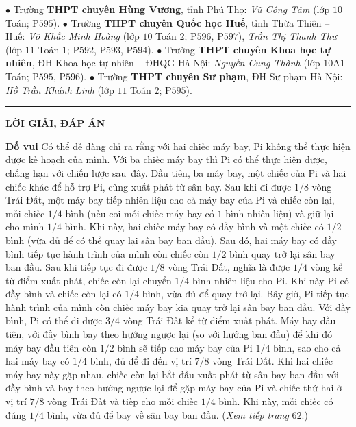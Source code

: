 \begin{multicols}{2}
	\vskip 0.05cm
	$\bullet$ Trường \textbf{\color{thachthuctoanhoc}THPT chuyên Hùng Vương}, tỉnh Phú Thọ: \textit{Vũ Công Tâm} (lớp $10$ Toán; P$595$).
	\vskip 0.05cm
	$\bullet$ Trường \textbf{\color{thachthuctoanhoc}THPT chuyên Quốc học Huế}, tỉnh Thừa Thiên -- Huế: \textit{Võ Khắc Minh Hoàng} (lớp $10$ Toán $2$; P$596$, P$597$), \textit{Trần Thị Thanh Thư} (lớp $11$ Toán $1$; P$592$, P$593$, P$594$).
	\vskip 0.05cm
	$\bullet$ Trường \textbf{\color{thachthuctoanhoc}THPT chuyên Khoa học tự nhiên}, ĐH Khoa học tự nhiên -- ĐHQG Hà Nội: \textit{Nguyễn Cung Thành} (lớp $10$A$1$ Toán; P$595$, P$596$).
	\vskip 0.05cm
	$\bullet$ Trường \textbf{\color{thachthuctoanhoc}THPT chuyên Sư phạm}, ĐH Sư phạm Hà Nội: \textit{Hồ Trần Khánh Linh} (lớp $11$ Toán $2$; P$595$).
\end{multicols}
\vspace*{-10pt}
\rule{1\linewidth}{0.1pt}
\begin{center}
	\textbf{\Large\color{thachthuctoanhoc}LỜI GIẢI, ĐÁP ÁN}
\end{center}
\begin{multicols}{2}
	\textbf{\color{thachthuctoanhoc}Đố vui}
	\vskip 0.1cm 
	Có thể dễ dàng chỉ ra rằng với hai chiếc máy bay, Pi không thể thực hiện được kế hoạch của mình. Với ba chiếc máy bay thì Pi có thể thực hiện được, chẳng hạn với chiến lược sau~đây.   
	\vskip 0.1cm
	Đầu tiên, ba máy bay, một chiếc của Pi và hai chiếc khác để hỗ trợ Pi, cùng xuất phát từ sân bay. Sau khi đi được $1/8$ vòng Trái Đất, một máy bay tiếp nhiên liệu cho cả máy bay của Pi và chiếc còn lại, mỗi chiếc $1/4$ bình (nếu coi mỗi chiếc máy bay có $1$ bình nhiên liệu) và giữ lại cho mình $1/4$ bình. Khi này, hai chiếc máy bay có đầy bình và một chiếc có $1/2$ bình (vừa đủ để có thể quay lại sân bay ban đầu). Sau đó, hai máy bay có đầy bình tiếp tục hành trình của mình còn chiếc còn $1/2$ bình quay trở lại sân bay ban đầu. 
	\vskip 0.1cm
	Sau khi tiếp tục đi được $1/8$ vòng Trái Đất, nghĩa là được $1/4$ vòng kể từ điểm xuất phát, chiếc còn lại chuyển $1/4$ bình nhiên liệu cho Pi. Khi này Pi có đầy bình và chiếc còn lại có $1/4$ bình, vừa đủ để quay trở lại. Bây giờ, Pi tiếp tục hành trình của mình còn chiếc máy bay kia quay trở lại sân bay ban đầu. Với đầy bình, Pi có thể đi được $3/4$ vòng Trái Đất kể từ điểm xuất phát. 
	\vskip 0.1cm
	Máy bay đầu tiên, với đầy bình bay theo hướng ngược lại (so với hướng ban đầu) để 
	khi đó máy bay đầu tiên còn $1/2$ bình sẽ tiếp cho máy bay của Pi $1/4$ bình, sao cho cả hai máy bay có $1/4$ bình, đủ để đi đến vị trí $7/8$ vòng Trái Đất. Khi hai chiếc máy bay này gặp nhau, chiếc còn lại bắt đầu xuất phát từ sân bay ban đầu với đầy bình và bay theo hướng ngược lại để gặp máy bay của Pi và chiếc thứ hai ở vị trí $7/8$ vòng Trái Đất và tiếp cho mỗi chiếc $1/4$ bình. Khi này, mỗi chiếc có đúng $1/4$ bình, vừa đủ để bay về sân bay ban đầu.   
	\vskip 0.1cm
	\hfill (\textit{Xem tiếp trang} $62$.)
\end{multicols}
